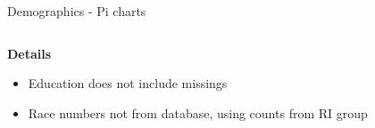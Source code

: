 \begin{frame}{Demographics - Pi charts}
\begin{columns}[c]
    \end{columns}

    \textbf{Details}
    \begin{itemize}
        \item Education does not include missings
        \item Race numbers not from database, using counts from RI group
    \end{itemize}

\end{frame}


